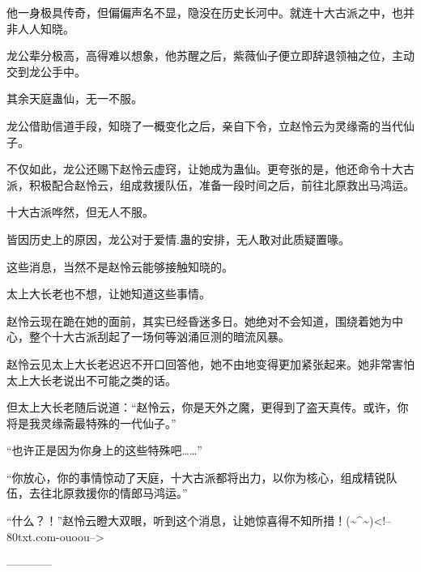 \begin{this_body}
他一身极具传奇，但偏偏声名不显，隐没在历史长河中。就连十大古派之中，也并非人人知晓。

龙公辈分极高，高得难以想象，他苏醒之后，紫薇仙子便立即辞退领袖之位，主动交到龙公手中。

其余天庭蛊仙，无一不服。

龙公借助信道手段，知晓了一概变化之后，亲自下令，立赵怜云为灵缘斋的当代仙子。

不仅如此，龙公还赐下赵怜云虚窍，让她成为蛊仙。更夸张的是，他还命令十大古派，积极配合赵怜云，组成救援队伍，准备一段时间之后，前往北原救出马鸿运。

十大古派哗然，但无人不服。

皆因历史上的原因，龙公对于爱情.蛊的安排，无人敢对此质疑置喙。

这些消息，当然不是赵怜云能够接触知晓的。

太上大长老也不想，让她知道这些事情。

赵怜云现在跪在她的面前，其实已经昏迷多日。她绝对不会知道，围绕着她为中心，整个十大古派刮起了一场何等汹涌叵测的暗流风暴。

赵怜云见太上大长老迟迟不开口回答他，她不由地变得更加紧张起来。她非常害怕太上大长老说出不可能之类的话。

但太上大长老随后说道：“赵怜云，你是天外之魔，更得到了盗天真传。或许，你将是我灵缘斋最特殊的一代仙子。”

“也许正是因为你身上的这些特殊吧……”

“你放心，你的事情惊动了天庭，十大古派都将出力，以你为核心，组成精锐队伍，去往北原救援你的情郎马鸿运。”

“什么？！”赵怜云瞪大双眼，听到这个消息，让她惊喜得不知所措！(\~{}\^{}\~{})<!--80txt.com-ouoou-->

------------

\end{this_body}


